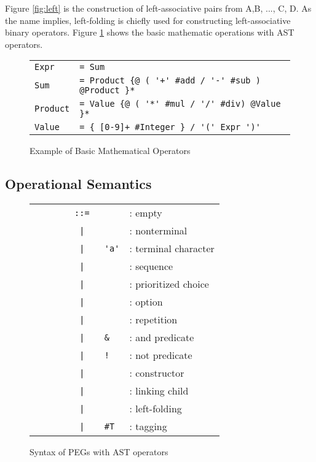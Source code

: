 \documentclass[JIP]{ipsj}
\begin{document}
Figure \ref{fig:left} is the construction of left-associative pairs from A,B, ..., C, D. As the name implies, left-folding is chiefly used for constructing left-associative binary operators. Figure \ref{fig:math} shows the basic mathematic operations with AST operators. 

\begin{figure}[tb]
\begin{tabular}{ll} \hline
{\tt Expr} & \verb|= Sum| \\
{\tt Sum} & \verb|= Product {@ ( '+' #add / '-' #sub ) @Product }*| \\
{\tt Product} & \verb|= Value {@ ( '*' #mul / '/' #div) @Value }*| \\
{\tt Value} & \verb|= { [0-9]+ #Integer } / '(' Expr ')' | \\ \hline
\end{tabular}
\caption{Example of Basic Mathematical Operators }
\label{fig:math}
\end{figure}



\subsection{Operational Semantics}



\begin{figure}[tb]
\begin{center}
\begin{tabular}{|lrll|} \hline
 &  \verb|      ::= | &  & : empty \\ 
& \verb#|  # &  & : nonterminal  \\
& \verb#|  # & \verb|'a'| & : terminal character \\
& \verb#|  # &   &  : sequence \\
& \verb#|  # &  &  : prioritized choice \\
& \verb#|  # &  &  : option   \\
& \verb#|  # &  &  : repetition  \\
& \verb#|  # & \verb|&| & : and predicate  \\
& \verb#|  # & \verb|!| & : not predicate  \\
& \verb#|  # &  & : constructor  \\
& \verb#|  # &  & : linking child  \\
& \verb#|  # &  & : left-folding \\
& \verb#|  # & \verb|#T| & : tagging  \\
\hline
\end{tabular}
\end{center}
\caption{Syntax of PEGs with AST operators}
\label{fig:syntax}
\end{figure}
\end{document}
